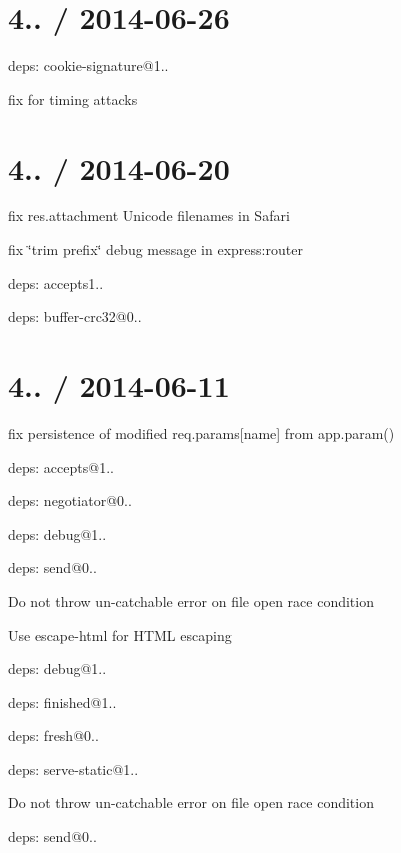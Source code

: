 \section*{4.. / 2014-\/06-\/26 }


\begin{DoxyItemize}
\item deps\+: cookie-\/signature@1..
\begin{DoxyItemize}
\item fix for timing attacks
\end{DoxyItemize}
\end{DoxyItemize}

\section*{4.. / 2014-\/06-\/20 }


\begin{DoxyItemize}
\item fix {\ttfamily res.\+attachment} Unicode filenames in Safari
\item fix \char`\"{}trim prefix\char`\"{} debug message in {\ttfamily express\+:router}
\item deps\+: accepts1..
\item deps\+: buffer-\/crc32@0..
\end{DoxyItemize}

\section*{4.. / 2014-\/06-\/11 }


\begin{DoxyItemize}
\item fix persistence of modified {\ttfamily req.\+params\mbox{[}name\mbox{]}} from {\ttfamily app.\+param()}
\item deps\+: accepts@1..
\begin{DoxyItemize}
\item deps\+: negotiator@0..
\end{DoxyItemize}
\item deps\+: debug@1..
\item deps\+: send@0..
\begin{DoxyItemize}
\item Do not throw un-\/catchable error on file open race condition
\item Use {\ttfamily escape-\/html} for H\+T\+M\+L escaping
\item deps\+: debug@1..
\item deps\+: finished@1..
\item deps\+: fresh@0..
\end{DoxyItemize}
\item deps\+: serve-\/static@1..
\begin{DoxyItemize}
\item Do not throw un-\/catchable error on file open race condition
\item deps\+: send@0..
\end{DoxyItemize}
\end{DoxyItemize}

